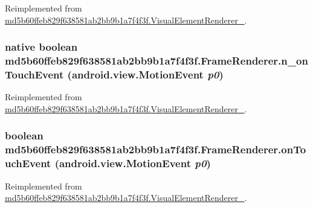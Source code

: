Reimplemented from \hyperlink{classmd5b60ffeb829f638581ab2bb9b1a7f4f3f_1_1_visual_element_renderer__1_4a1c180026d8eab71549e47b7de4b9b8}{md5b60ffeb829f638581ab2bb9b1a7f4f3f.VisualElementRenderer\_}.\hypertarget{classmd5b60ffeb829f638581ab2bb9b1a7f4f3f_1_1_frame_renderer_f5975cde0cd3d4980507d2033988a61d}{
\subsubsection[{n\_\-onTouchEvent}]{\setlength{\rightskip}{0pt plus 5cm}native boolean md5b60ffeb829f638581ab2bb9b1a7f4f3f.FrameRenderer.n\_\-onTouchEvent (android.view.MotionEvent {\em p0})}}
\label{classmd5b60ffeb829f638581ab2bb9b1a7f4f3f_1_1_frame_renderer_f5975cde0cd3d4980507d2033988a61d}




Reimplemented from \hyperlink{classmd5b60ffeb829f638581ab2bb9b1a7f4f3f_1_1_visual_element_renderer__1_bf46ffd446313b87383a085a60d65dd4}{md5b60ffeb829f638581ab2bb9b1a7f4f3f.VisualElementRenderer\_}.\hypertarget{classmd5b60ffeb829f638581ab2bb9b1a7f4f3f_1_1_frame_renderer_86dff6d2f4926a6282df9c47cb59bbcf}{
\subsubsection[{onTouchEvent}]{\setlength{\rightskip}{0pt plus 5cm}boolean md5b60ffeb829f638581ab2bb9b1a7f4f3f.FrameRenderer.onTouchEvent (android.view.MotionEvent {\em p0})}}
\label{classmd5b60ffeb829f638581ab2bb9b1a7f4f3f_1_1_frame_renderer_86dff6d2f4926a6282df9c47cb59bbcf}




Reimplemented from \hyperlink{classmd5b60ffeb829f638581ab2bb9b1a7f4f3f_1_1_visual_element_renderer__1_3beb6d0ebf9e1eca68fed2eac13c88ac}{md5b60ffeb829f638581ab2bb9b1a7f4f3f.VisualElementRenderer\_}.

